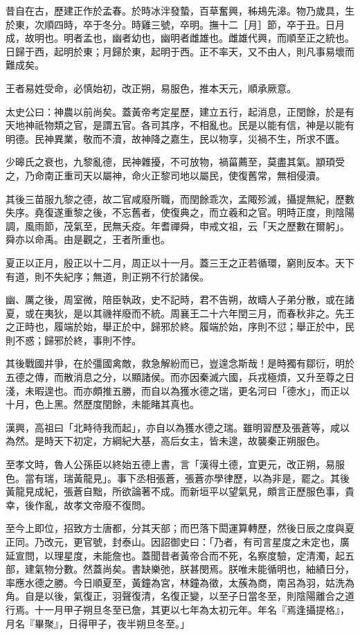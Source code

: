 
\begin{pinyinscope}
昔自在古，歷建正作於孟春。於時冰泮發蟄，百草奮興，秭鳺先滜。物乃歲具，生於東，次順四時，卒于冬分。時雞三號，卒明。撫十二［月］節，卒于丑。日月成，故明也。明者孟也，幽者幼也，幽明者雌雄也。雌雄代興，而順至正之統也。日歸于西，起明於東；月歸於東，起明于西。正不率天，又不由人，則凡事易壞而難成矣。

王者易姓受命，必慎始初，改正朔，易服色，推本天元，順承厥意。

太史公曰：神農以前尚矣。蓋黃帝考定星歷，建立五行，起消息，正閏餘，於是有天地神祇物類之官，是謂五官。各司其序，不相亂也。民是以能有信，神是以能有明德。民神異業，敬而不瀆，故神降之嘉生，民以物享，災禍不生，所求不匱。

少暤氏之衰也，九黎亂德，民神雜擾，不可放物，禍菑薦至，莫盡其氣。顓頊受之，乃命南正重司天以屬神，命火正黎司地以屬民，使復舊常，無相侵瀆。

其後三苗服九黎之德，故二官咸廢所職，而閏餘乖次，孟陬殄滅，攝提無紀，歷數失序。堯復遂重黎之後，不忘舊者，使復典之，而立羲和之官。明時正度，則陰陽調，風雨節，茂氣至，民無夭疫。年耆禪舜，申戒文祖，云「天之歷數在爾躬」。舜亦以命禹。由是觀之，王者所重也。

夏正以正月，殷正以十二月，周正以十一月。蓋三王之正若循環，窮則反本。天下有道，則不失紀序；無道，則正朔不行於諸侯。

幽、厲之後，周室微，陪臣執政，史不記時，君不告朔，故疇人子弟分散，或在諸夏，或在夷狄，是以其禨祥廢而不統。周襄王二十六年閏三月，而春秋非之。先王之正時也，履端於始，舉正於中，歸邪於終。履端於始，序則不愆；舉正於中，民則不惑；歸邪於終，事則不悖。

其後戰國并爭，在於彊國禽敵，救急解紛而已，豈遑念斯哉！是時獨有鄒衍，明於五德之傳，而散消息之分，以顯諸侯。而亦因秦滅六國，兵戎極煩，又升至尊之日淺，未暇遑也。而亦頗推五勝，而自以為獲水德之瑞，更名河曰「德水」，而正以十月，色上黑。然歷度閏餘，未能睹其真也。

漢興，高祖曰「北畤待我而起」，亦自以為獲水德之瑞。雖明習歷及張蒼等，咸以為然。是時天下初定，方綱紀大基，高后女主，皆未遑，故襲秦正朔服色。

至孝文時，魯人公孫臣以終始五德上書，言「漢得土德，宜更元，改正朔，易服色。當有瑞，瑞黃龍見」。事下丞相張蒼，張蒼亦學律歷，以為非是，罷之。其後黃龍見成紀，張蒼自黜，所欲論著不成。而新垣平以望氣見，頗言正歷服色事，貴幸，後作亂，故孝文帝廢不復問。

至今上即位，招致方士唐都，分其天部；而巴落下閎運算轉歷，然後日辰之度與夏正同。乃改元，更官號，封泰山。因詔御史曰：「乃者，有司言星度之未定也，廣延宣問，以理星度，未能詹也。蓋聞昔者黃帝合而不死，名察度驗，定清濁，起五部，建氣物分數。然蓋尚矣。書缺樂弛，朕甚閔焉。朕唯未能循明也，紬績日分，率應水德之勝。今日順夏至，黃鐘為宮，林鐘為徵，太蔟為商，南呂為羽，姑洗為角。自是以後，氣復正，羽聲復清，名復正變，以至子日當冬至，則陰陽離合之道行焉。十一月甲子朔旦冬至已詹，其更以七年為太初元年。年名『焉逢攝提格』，月名『畢聚』，日得甲子，夜半朔旦冬至。」


\end{pinyinscope}
